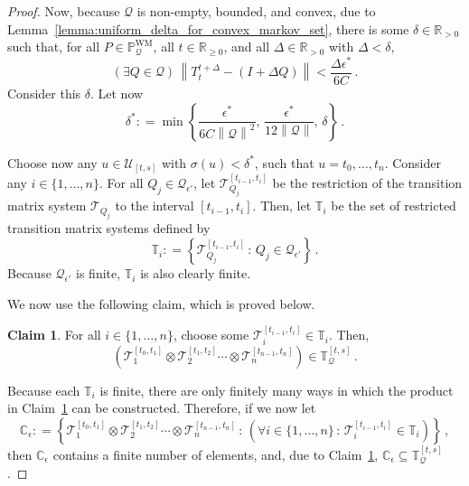 \documentclass[10pt]{paper}
\theoremstyle{definition}
\newtheorem{claim}{Claim}[theorem]
\newcommand{\reals}{\mathbb{R}}
\newcommand{\realspos}{\reals_{>0}}
\newcommand{\realsnonneg}{\reals_{\geq 0}}
\newcommand{\processes}{\mathbb{P}}
\newcommand{\wmprocesses}{\processes^{\mathrm{WM}}}
\newcommand{\rateset}{\mathcal{Q}}
\newcommand{\norm}[1]{\left\lVert #1 \right\rVert}
\newcommand{\coloneqq}{:\!=}
\begin{document}
\begin{proof}
Now, because $\rateset$ is non-empty, bounded, and convex, due to Lemma~\ref{lemma:uniform_delta_for_convex_markov_set}, there is some $\delta\in\realspos$ such that, for all $P\in\wmprocesses_\rateset$, all $t\in\realsnonneg$, and all $\Delta\in\realspos$ with $\Delta<\delta$,
\begin{equation}\label{eq:lemma_total_bounded_uniform_delta}
(\exists Q\in\rateset)\,\norm{T_t^{t+\Delta} - (I+\Delta Q)} < \frac{\Delta\epsilon^*}{6C}\,.
\end{equation}
Consider this $\delta$. Let now
\begin{equation*}
\delta^* \coloneqq \min\left\{\frac{\epsilon^*}{6C\norm{\rateset}^2},\, \frac{\epsilon^*}{12\norm{\rateset}},\, \delta\right\}\,.
\end{equation*}

Choose now any $u\in\mathcal{U}_{[t,s]}$ with $\sigma(u)<\delta^*$, such that $u=t_0,\ldots,t_n$. Consider any $i\in\{1,\ldots,n\}$. For all $Q_j\in\rateset_{\epsilon'}$, let $\mathcal{T}_{Q_j}^{[t_{i-1},t_i]}$ be the restriction of the transition matrix system $\mathcal{T}_{Q_j}$ to the interval $[t_{i-1},t_i]$. Then, let $\mathbb{T}_i$ be the set of restricted transition matrix systems defined by
\begin{equation*}
\mathbb{T}_i \coloneqq \left\{ \mathcal{T}_{Q_j}^{[t_{i-1},t_i]} \,:\,Q_j\in\rateset_{\epsilon'} \right\}\,.
\end{equation*}
Because $\rateset_{\epsilon'}$ is finite, $\mathbb{T}_i$ is also clearly finite.

We now use the following claim, which is proved below.
\begin{claim}\label{claim:composition_restricted_trans_mat_sys_in_set}
For all $i\in\{1,\ldots,n\}$, choose some $\mathcal{T}_i^{[t_{i-1},t_i]}\in\mathbb{T}_i$. Then,
\begin{equation*}
\left(\mathcal{T}_1^{[t_{0},t_1]} \otimes \mathcal{T}_2^{[t_{1},t_2]} \cdots \otimes \mathcal{T}_n^{[t_{n-1},t_n]}\right) \in \mathbb{T}_\rateset^{[t,s]}\,.
\end{equation*}
\end{claim}
Because each $\mathbb{T}_i$ is finite, there are only finitely many ways in which the product in Claim~\ref{claim:composition_restricted_trans_mat_sys_in_set} can be constructed. Therefore, if we now let
\begin{equation*}
\mathbb{C}_\epsilon \coloneqq \left\{\mathcal{T}_1^{[t_{0},t_1]} \otimes \mathcal{T}_2^{[t_{1},t_2]} \cdots \otimes \mathcal{T}_n^{[t_{n-1},t_n]}\,:\,\left(\forall i\in\{1,\ldots,n\} \,:\,\mathcal{T}_i^{[t_{i-1},t_i]}\in\mathbb{T}_i\right) \right\}\,,
\end{equation*}
then $\mathbb{C}_\epsilon$ contains a finite number of elements, and, due to Claim~\ref{claim:composition_restricted_trans_mat_sys_in_set}, $\mathbb{C}_\epsilon\subseteq \mathbb{T}_\rateset^{[t,s]}$.


\end{proof}
\end{document}
